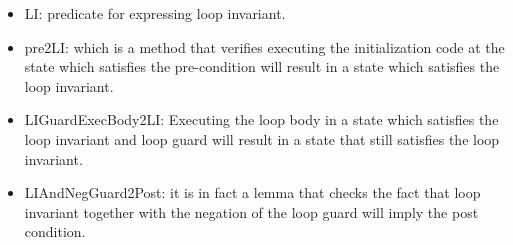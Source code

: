 \begin{itemize}
\item LI: predicate for expressing loop invariant.
\item pre2LI: which is a method that verifies executing the initialization code at the state which satisfies the pre-condition will result in a state which satisfies the loop invariant.

\item LIGuardExecBody2LI: Executing the loop body in a state which satisfies the loop invariant and loop guard will result in a state that still satisfies the loop invariant.

\item LIAndNegGuard2Post: it is in fact a lemma that checks the fact that loop invariant together with the negation of the loop guard will imply the post condition.
\end{itemize}
